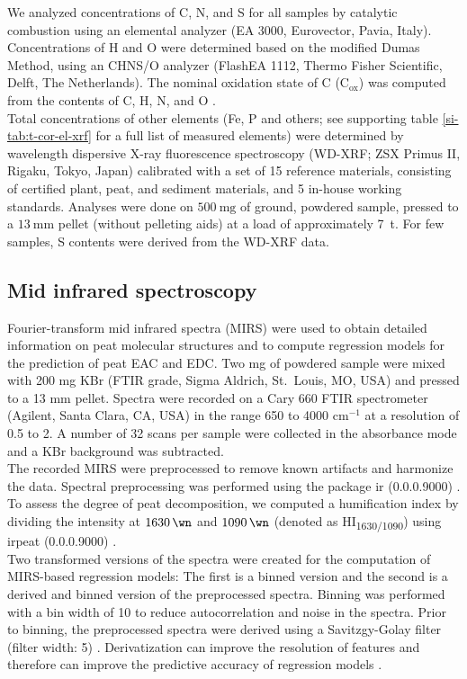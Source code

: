 \documentclass[draft,linenumbers]{agujournal2018}
\begin{document}
We analyzed concentrations of C, N, and S for all samples by catalytic
combustion using an elemental analyzer (EA 3000, Eurovector, Pavia,
Italy). Concentrations of H and O were determined based on the modified
Dumas Method, using an CHNS/O analyzer (FlashEA 1112, Thermo Fisher
Scientific, Delft, The Netherlands). The nominal oxidation state of C
(C\(_\textrm{ox}\)) was computed from the contents of C, H, N, and O
\citep{Masiello.2008, Worrall.2016b}.\\
Total concentrations of other elements (Fe, P and others; see supporting
table \ref{si-tab:t-cor-el-xrf} for a full list of measured elements)
were determined by wavelength dispersive X-ray fluorescence spectroscopy
(WD-XRF; ZSX Primus II, Rigaku, Tokyo, Japan) calibrated with a set of
15 reference materials, consisting of certified plant, peat, and
sediment materials, and 5 in-house working standards. Analyses were done
on \(\SI{500}{\milli\g}\) of ground, powdered sample, pressed to a
\(\SI{13}{\milli\m}\) pellet (without pelleting aids) at a load of
approximately \SI{7}{\tonne}. For few samples, S contents were derived
from the WD-XRF data.

\subsection{Mid infrared spectroscopy}

Fourier-transform mid infrared spectra (MIRS) were used to obtain
detailed information on peat molecular structures and to compute
regression models for the prediction of peat EAC and EDC. Two mg of
powdered sample were mixed with 200 mg KBr (FTIR grade, Sigma Aldrich,
St.~Louis, MO, USA) and pressed to a 13 mm pellet. Spectra were recorded
on a Cary 660 FTIR spectrometer (Agilent, Santa Clara, CA, USA) in the
range 650 to 4000 cm\(^{-1}\) at a resolution of 0.5 to \SI{2}{\wn}. A
number of 32 scans per sample were collected in the absorbance mode and
a KBr background was subtracted.\\
The recorded MIRS were preprocessed to remove known artifacts and
harmonize the data. Spectral preprocessing was performed using the
package ir (0.0.0.9000) \citep{Teickner.2020}. To assess the degree of
peat decomposition, we computed a humification index by dividing the
intensity at \(\SI{1630}{\wn}\) and \(\SI{1090}{\wn}\) (denoted as
HI\textsubscript{1630/1090}) \citep{Broder.2012} using irpeat
(0.0.0.9000) \citep{Teickner.2020b}.\\
Two transformed versions of the spectra were created for the computation
of MIRS-based regression models: The first is a binned version and the
second is a derived and binned version of the preprocessed spectra.
Binning was performed with a bin width of \SI{10}{\wn} to reduce
autocorrelation and noise in the spectra. Prior to binning, the
preprocessed spectra were derived using a Savitzgy-Golay filter (filter
width: \SI{5}{\wn}) \citep{signaldevelopers.2014}. Derivatization can
improve the resolution of features and therefore can improve the
predictive accuracy of regression models
\citep{Stuart.2005, Engel.2013}.
\end{document}
